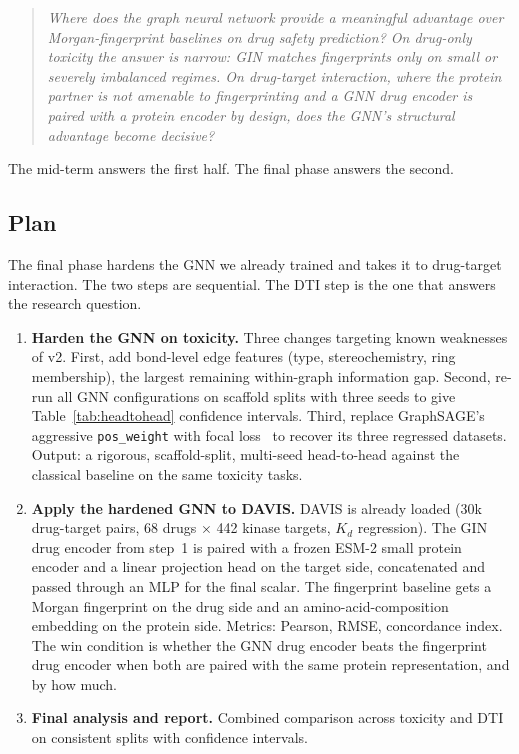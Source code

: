 \documentclass[a4paper,11pt]{article}
\begin{document}
\begin{quote}
\textit{Where does the graph neural network provide a meaningful advantage over Morgan-fingerprint baselines on drug safety prediction? On drug-only toxicity the answer is narrow: GIN matches fingerprints only on small or severely imbalanced regimes. On drug-target interaction, where the protein partner is not amenable to fingerprinting and a GNN drug encoder is paired with a protein encoder by design, does the GNN's structural advantage become decisive?}
\end{quote}

The mid-term answers the first half. The final phase answers the second.

\subsection{Plan}

The final phase hardens the GNN we already trained and takes it to drug-target interaction. The two steps are sequential. The DTI step is the one that answers the research question.

\begin{enumerate}[leftmargin=2em]
\item \textbf{Harden the GNN on toxicity.} Three changes targeting known weaknesses of v2. First, add bond-level edge features (type, stereochemistry, ring membership), the largest remaining within-graph information gap. Second, re-run all GNN configurations on scaffold splits with three seeds to give Table~\ref{tab:headtohead} confidence intervals. Third, replace GraphSAGE's aggressive \texttt{pos\_weight} with focal loss~\cite{lin2017} to recover its three regressed datasets. Output: a rigorous, scaffold-split, multi-seed head-to-head against the classical baseline on the same toxicity tasks.
\item \textbf{Apply the hardened GNN to DAVIS.} DAVIS is already loaded (30k drug-target pairs, 68 drugs $\times$ 442 kinase targets, $K_d$ regression). The GIN drug encoder from step~1 is paired with a frozen ESM-2 small protein encoder and a linear projection head on the target side, concatenated and passed through an MLP for the final scalar. The fingerprint baseline gets a Morgan fingerprint on the drug side and an amino-acid-composition embedding on the protein side. Metrics: Pearson, RMSE, concordance index. The win condition is whether the GNN drug encoder beats the fingerprint drug encoder when both are paired with the same protein representation, and by how much.
\item \textbf{Final analysis and report.} Combined comparison across toxicity and DTI on consistent splits with confidence intervals.
\end{enumerate}
\end{document}

